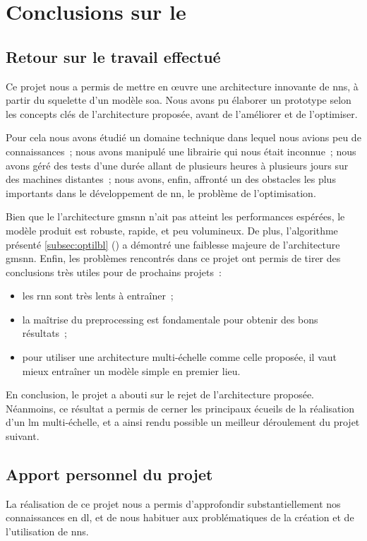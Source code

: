 \chapter{Conclusions sur le }
\section{Retour sur le travail effectué}
Ce projet nous a permis de mettre en œuvre une architecture innovante de \glspl{nn}, à partir du squelette d'un modèle \gls{soa}.
Nous avons pu élaborer un prototype selon les concepts clés de l'architecture proposée, avant de l'améliorer et de l'optimiser.

Pour cela nous avons étudié un domaine technique dans lequel nous avions peu de connaissances~; nous avons manipulé une librairie qui nous était inconnue~;
nous avons géré des tests d'une durée allant de plusieurs heures à plusieurs jours sur des machines distantes~; nous avons, enfin, affronté un des obstacles les plus importants dans le développement de \gls{nn}, le problème de l'optimisation.

Bien que le l'architecture \gls{gmsnn} n'ait pas atteint les performances espérées, le modèle produit est robuste, rapide, et peu volumineux.
De plus, l'algorithme présenté \autoref{subsec:optilbl} () a démontré une faiblesse majeure de l'architecture \gls{gmsnn}.
Enfin, les problèmes rencontrés dans ce projet ont permis de tirer des conclusions très utiles pour de prochains projets~:
\begin{itemize}
	\item les \gls{rnn} sont très lents à entraîner~;
	\item la maîtrise du \gls{preprocessing} est fondamentale pour obtenir des bons résultats~;
	\item pour utiliser une architecture multi-échelle comme celle proposée, il vaut mieux entraîner un modèle simple en premier lieu.
\end{itemize}\hspace{1em}

En conclusion, le projet a abouti sur le rejet de l'architecture proposée.
Néanmoins, ce résultat a permis de cerner les principaux écueils de la réalisation d'un \gls{lm} multi-échelle, et a ainsi rendu possible un meilleur déroulement du projet suivant.


\section{Apport personnel du projet}
La réalisation de ce projet nous a permis d'approfondir substantiellement nos connaissances en \gls{dl}, et de nous habituer aux problématiques de la création et de l'utilisation de \glspl{nn}.

